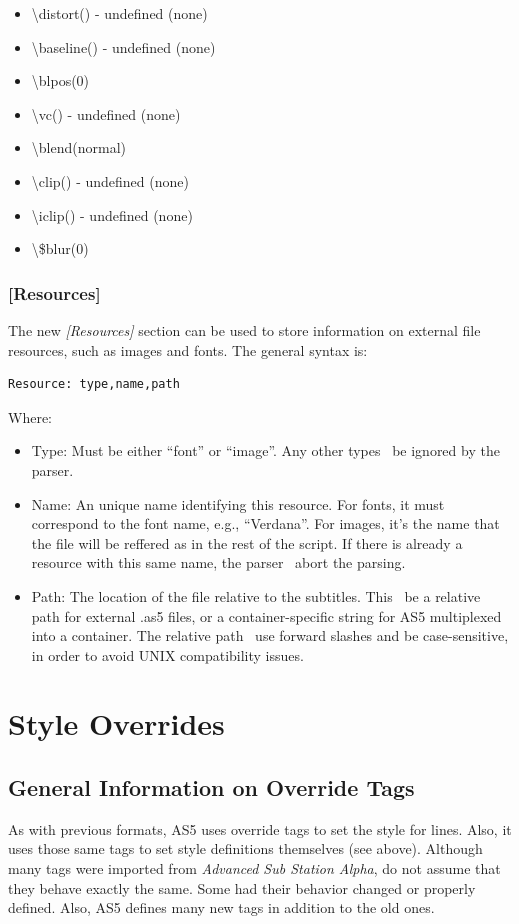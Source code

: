 \documentclass{spec}
\begin{document}
\begin{itemize}
\item \textbackslash distort() - undefined (none)
\item \textbackslash baseline() - undefined (none)
\item \textbackslash blpos(0)
\item \textbackslash vc() - undefined (none)
\item \textbackslash blend(normal)
\item \textbackslash clip() - undefined (none)
\item \textbackslash iclip() - undefined (none)
\item \textbackslash \$blur(0)
\end{itemize}

\subsubsection{[Resources]}

The new \emph{[Resources]} section can be used to store information on external file resources,
such as images and fonts. The general syntax is:

\begin{verbatim}
Resource: type,name,path
\end{verbatim}

Where:

\begin{itemize}
\item Type: Must be either ``font'' or ``image''. Any other types \must\ be ignored by the parser.
\item Name: An unique name identifying this resource. For fonts, it must correspond to the font
name, e.g., ``Verdana''. For images, it's the name that the file will be reffered as in the rest
of the script. If there is already a resource with this same name, the parser \must\ abort the
parsing.
\item Path: The location of the file relative to the subtitles. This \must\ be a relative path
for external .as5 files, or a container-specific string for AS5 multiplexed into a container.
The relative path \must\ use forward slashes and be case-sensitive, in order to avoid UNIX
compatibility issues.
\end{itemize}


\newpage
\section{Style Overrides}

\subsection{General Information on Override Tags}
As with previous formats, AS5 uses override tags to set the style for lines. Also, it uses those
same tags to set style definitions themselves (see above). Although many tags were imported from
\emph{Advanced Sub Station Alpha}, do not assume that they behave exactly the same. Some had their
behavior changed or properly defined. Also, AS5 defines many new tags in addition to the old ones.
\end{document}
